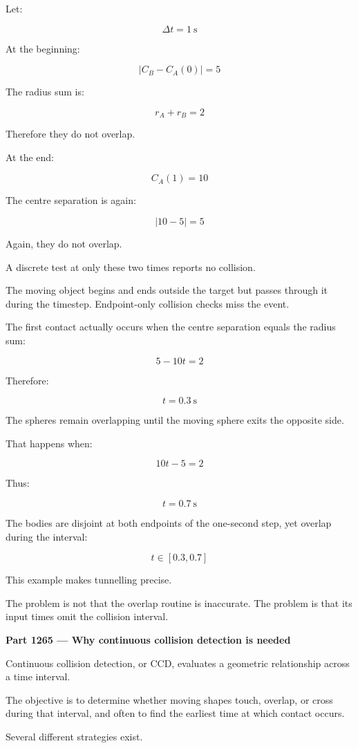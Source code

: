 Let:

\[
\Delta t=1\ \mathrm{s}
\]

At the beginning:

\[
|C_B-C_A(0)|=5
\]

The radius sum is:

\[
r_A+r_B=2
\]

Therefore they do not overlap.

At the end:

\[
C_A(1)=10
\]

The centre separation is again:

\[
|10-5|=5
\]

Again, they do not overlap.

A discrete test at only these two times reports no collision.

The moving object begins and ends outside the target but passes through it during the timestep. Endpoint-only collision checks miss the event.

The first contact actually occurs when the centre separation equals the radius sum:

\[
5-10t=2
\]

Therefore:

\[
\boxed{t=0.3\ \mathrm{s}}
\]

The spheres remain overlapping until the moving sphere exits the opposite side.

That happens when:

\[
10t-5=2
\]

Thus:

\[
\boxed{t=0.7\ \mathrm{s}}
\]

The bodies are disjoint at both endpoints of the one-second step, yet overlap during the interval:

\[
\boxed{t\in[0.3,0.7]}
\]

This example makes tunnelling precise.

The problem is not that the overlap routine is inaccurate. The problem is that its input times omit the collision interval.

\textbf{Part 1265 --- Why continuous collision detection is needed}

Continuous collision detection, or CCD, evaluates a geometric relationship across a time interval.

The objective is to determine whether moving shapes touch, overlap, or cross during that interval, and often to find the earliest time at which contact occurs.

Several different strategies exist.

